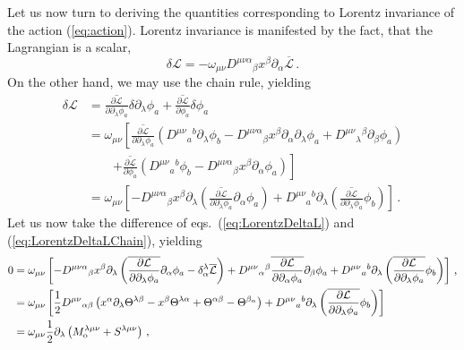 \documentclass[a4paper,12pt]{article}
\def\lag{{\mathcal{L}}}
\begin{document}
Let us now turn to deriving the quantities corresponding to Lorentz invariance of the action (\ref{eq:action}). Lorentz invariance is manifested by the fact, that the Lagrangian is a scalar,
\begin{equation}\label{eq:LorentzDeltaL}
 \delta\lag = -\omega_{\mu\nu}D^{\mu\nu\alpha}{}_\beta x^\beta \partial_\alpha\overline{\lag}\,.
\end{equation}
On the other hand, we may use the chain rule, yielding
\begin{equation}\label{eq:LorentzDeltaLChain}
\begin{aligned}
 \delta\lag &= \overline{\frac{\partial\lag}{\partial\partial_\lambda\phi_a}}\delta\partial_\lambda\phi_a + \overline{\frac{\partial\lag}{\partial\phi_a}}\delta\phi_a\\
 &= 
 \omega_{\mu\nu}\left[\overline{\frac{\partial\lag}{\partial\partial_\lambda\phi_a}} \left( D^{\mu\nu}{}_a{}^b \partial_\lambda\phi_b -D^{\mu\nu\alpha}{}_\beta x^\beta \partial_\alpha \partial_\lambda\phi_a + D^{\mu\nu}{}_\lambda{}^\beta \partial_\beta \phi_a\right)
 \right.\\
 &\quad\quad\left.
 +\overline{\frac{\partial\lag}{\partial\phi_a}}\left(D^{\mu\nu}{}_a{}^b \phi_b-D^{\mu\nu\alpha}{}_\beta x^\beta\partial_\alpha \phi_a\right)
 \right] \\
 &= \omega_{\mu\nu}\left[-D^{\mu\nu\alpha}{}_\beta x^\beta \partial_\lambda \left( \overline{\frac{\partial\lag}{\partial\partial_\lambda\phi_a}}\partial_\alpha\phi_a\right)+D^{\mu\nu}{}_a{}^b \partial_\lambda \left( \overline{\frac{\partial\lag}{\partial\partial_\lambda\phi_a}}\phi_b\right)\right]\,.
\end{aligned}
\end{equation}
Let us now take the difference of eqs.\ (\ref{eq:LorentzDeltaL}) and (\ref{eq:LorentzDeltaLChain}), yielding
\begin{equation}\label{eq:LorentzDeltaL0}
\begin{aligned}
 0 &= \omega_{\mu\nu}\left[-D^{\mu\nu\alpha}{}_\beta x^\beta \partial_\lambda \left( \overline{\frac{\partial\lag}{\partial\partial_\lambda\phi_a}}\partial_\alpha\phi_a-\delta^\lambda_\alpha \overline{\lag}\right)
 +D^{\mu\nu}{}_{\alpha}{}^\beta \overline{\frac{\partial\lag}{\partial\partial_\alpha\phi_a}}\partial_\beta \phi_a
 +D^{\mu\nu}{}_a{}^b \partial_\lambda \left( \overline{\frac{\partial\lag}{\partial\partial_\lambda\phi_a}}\phi_b\right)\right]\,,\\
 &=\omega_{\mu\nu}\left[
 \frac{1}{2} D^{\mu\nu}{}_{\alpha\beta}\left( x^\alpha \partial_\lambda \Theta^{\lambda\beta}-x^\beta\Theta^{\lambda\alpha}+\Theta^{\alpha\beta}-\Theta^{\beta_\alpha}\right)
 +D^{\mu\nu}{}_a{}^b \partial_\lambda \left( \overline{\frac{\partial\lag}{\partial\partial_\lambda\phi_a}}\phi_b\right)
 \right]\\
 &= \omega_{\mu\nu}\frac{1}{2}\partial_\lambda \left(M^{\lambda\mu\nu}_{\rm o}+S^{\lambda\mu\nu}\right)\,,
 \end{aligned}
\end{equation}
\end{document}
